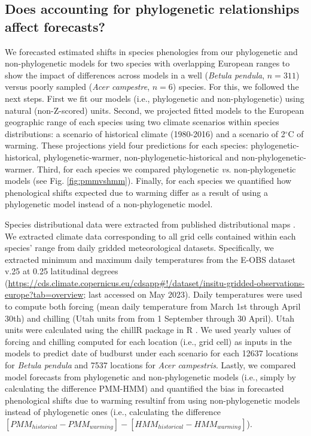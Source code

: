 \documentclass[11pt]{article}
\begin{document}
\subsection{Does accounting for phylogenetic relationships affect forecasts?}
We forecasted estimated shifts in species phenologies from our phylogenetic and non-phylogenetic models for two species with overlapping European ranges to show the impact of differences across models in a well (\emph{Betula pendula}, $n=311$) versus poorly sampled  (\emph{Acer campestre}, $n=6$) species. For this, we followed the next steps. First we fit our models (i.e., phylogenetic and non-phylogenetic) using natural (non-Z-scored) units. Second, we projected fitted models to the European geographic range of each species using two climate scenarios within species distributions: a scenario of historical climate (1980-2016) and a scenario of 2$^{\circ}$C of warming. These projections yield four predictions for each species: phylogenetic-historical, phylogenetic-warmer, non-phylogenetic-historical and non-phylogenetic-warmer. Third, for each species we compared phylogenetic \emph{vs}. non-phylogenetic models (see Fig. \ref{fig:pmmvshmm}). Finally, for each species we quantified how phenological shifts expected due to warming differ as a result of using a phylogenetic model instead of a non-phylogenetic model.  

Species distributional data were extracted from published distributional maps \citep{caudullo2017chorological}. We extracted climate data corresponding to all grid cells contained within each species' range from daily gridded meteorological datasets. Specifically, we extracted minimum and maximum daily temperatures from the E-OBS dataset v.25 at 0.25 latitudinal degrees (\url{https://cds.climate.copernicus.eu/cdsapp#!/dataset/insitu-gridded-observations-europe?tab=overview}; last accessed on May 2023). Daily temperatures were used to compute both forcing (mean daily temperature from March 1st through April 30th) and  chilling (Utah units from from 1 September through 30 April). Utah units were calculated using the chillR package in R \citep{luedeling2015package}. We used yearly values of forcing and chilling computed for each location (i.e., grid cell) as inputs in the models to predict date of budburst under each scenario for each 12637 locations for \emph{Betula pendula} and 7537 locations for \emph{Acer campestris}. Lastly, we compared model forecasts from phylogenetic and non-phylogenetic models (i.e., simply by calculating the difference PMM-HMM) and quantified the bias in forecasted phenological shifts due to warming resultinf from using non-phylogenetic models instead of phylogenetic ones (i.e., calculating the difference $[PMM_{historical} -PMM_{warming}]-[HMM_{historical}-HMM_{warming}]$).%
\end{document}
